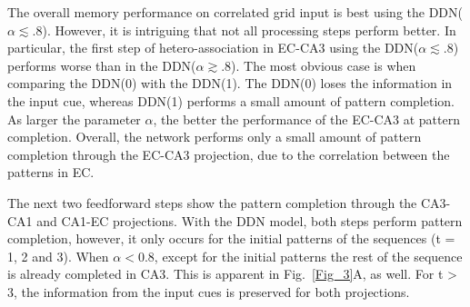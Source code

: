 \documentclass[utf8]{frontiersSCNS} %
\begin{document}

The overall memory performance on correlated grid input is best using the DDN($\alpha \lesssim .8$). 
%
However, it is intriguing that not all processing steps perform better. 
%
In particular, the first step of hetero-association in EC-CA3 using the DDN($\alpha \lesssim .8$) performs worse than in the DDN($\alpha \gtrsim .8$). The most obvious case is when comparing the DDN(0) with the DDN(1).
%
The DDN(0) loses the information in the input cue, whereas DDN(1) performs a small amount of pattern completion.
%
As larger the parameter $\alpha$, the better the performance of the EC-CA3 at pattern completion.
%
Overall, the network performs only a small amount of pattern completion through the EC-CA3 projection, due to the correlation between the patterns in EC.
%

The next two feedforward steps show the pattern completion through the CA3-CA1 and CA1-EC projections. With the DDN model, both steps perform pattern completion, however, it only occurs for the initial patterns of the sequences (t = 1, 2 and 3). When $\alpha < 0.8$, except for the initial patterns the rest of the sequence is already completed in CA3. This is apparent in Fig.~\ref{Fig_3}A, as well.
%
For t > 3, the information from the input cues is preserved for both projections.
%
\end{document}
